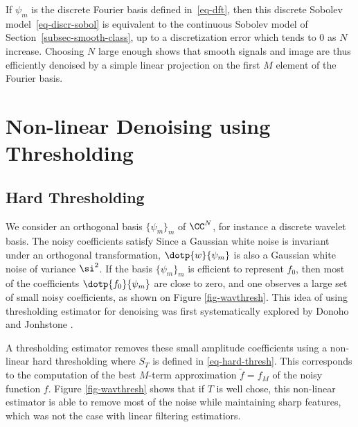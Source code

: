 If $\psi_m$ is the discrete Fourier basis defined in~\eqref{eq-dft}, then this discrete Sobolev model~\eqref{eq-discr-sobol} is equivalent to the continuous Sobolev model of Section~\ref{subsec-smooth-class}, up to a discretization error which tends to $0$ as $N$ increase. Choosing $N$ large enough shows that smooth signals and image are thus efficiently denoised by a simple linear projection on the first $M$ element of the Fourier basis. 


\section{Non-linear Denoising using Thresholding}
\label{sec-nl-denoising-thresh}

\subsection{Hard Thresholding}
\label{subsec-denoise-hard}

We consider an orthogonal basis $\{\psi_{m}\}_m$ of $\CC^N$, for instance a discrete wavelet basis.
%
The noisy coefficients satisfy
Since a Gaussian white noise is invariant under an orthogonal transformation, $\dotp{w}{\psi_m}$ is also a Gaussian white noise of variance $\si^2$. If the basis $\{\psi_m\}_m$ is efficient to represent $f_0$, then most of the coefficients $ \dotp{f_0}{\psi_m}$ are close to zero, and one observes a large set of small noisy coefficients, as shown on Figure \ref{fig-wavthresh}. This idea of using thresholding estimator for denoising was first systematically explored by Donoho and Jonhstone \cite{donoho-shrinkage}.


A thresholding estimator removes these small amplitude coefficients using a non-linear hard thresholding
where $S_T$ is defined in \eqref{eq-hard-thresh}. This corresponds to the computation of the best $M$-term approximation $\tilde f = f_M$ of the noisy function $f$. Figure \ref{fig-wavthresh} shows that if $T$ is well chose, this non-linear estimator is able to remove most of the noise while maintaining sharp features, which was not the case with linear filtering estimatiors.

